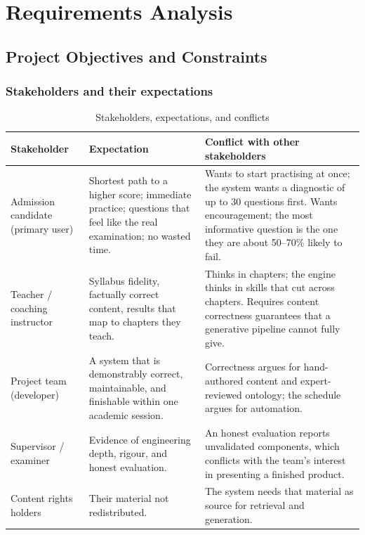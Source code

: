 \chapter{Requirements Analysis}
\label{ch:requirements}

\section{Project Objectives and Constraints}
\label{sec:requirements}

\subsection{Stakeholders and their expectations}

\begin{table}[htbp]
  \centering
  \caption{Stakeholders, expectations, and conflicts}
  \label{tab:stakeholders}
  \begin{tabularx}{\textwidth}{>{\hsize}Y>{\hsize}Y>{\hsize}Y}
    \toprule
    Stakeholder & Expectation & Conflict with other stakeholders \\
    \midrule
    Admission candidate (primary user) & Shortest path to a higher score; immediate practice; questions that feel like the real examination; no wasted time. & Wants to start practising at once; the system wants a diagnostic of up to 30 questions first. Wants encouragement; the most informative question is the one they are about 50--70\% likely to fail. \\
    Teacher / coaching instructor & Syllabus fidelity, factually correct content, results that map to chapters they teach. & Thinks in chapters; the engine thinks in skills that cut across chapters. Requires content correctness guarantees that a generative pipeline cannot fully give. \\
    Project team (developer) & A system that is demonstrably correct, maintainable, and finishable within one academic session. & Correctness argues for hand-authored content and expert-reviewed ontology; the schedule argues for automation. \\
    Supervisor / examiner & Evidence of engineering depth, rigour, and honest evaluation. & An honest evaluation reports unvalidated components, which conflicts with the team's interest in presenting a finished product. \\
    Content rights holders & Their material not redistributed. & The system needs that material as source for retrieval and generation. \\
    \bottomrule
  \end{tabularx}
\end{table}

